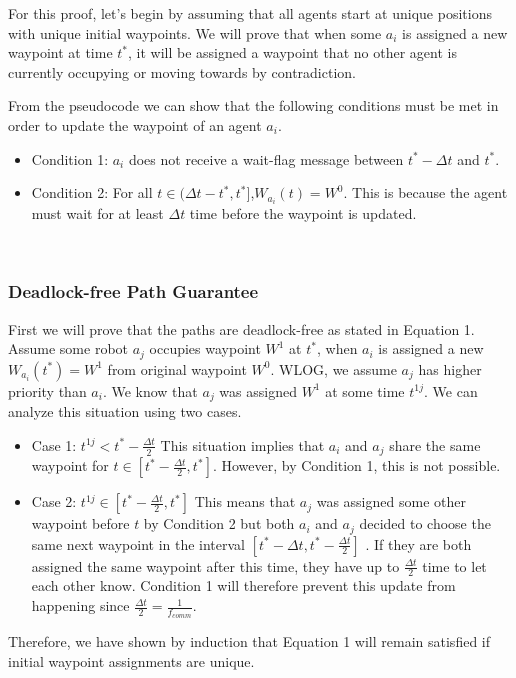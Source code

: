 For this proof, let's begin by assuming that all agents start at unique positions with unique initial waypoints. We will prove that when some $a_i$ is assigned a new waypoint at time $t^*$, it will be assigned a waypoint that no other agent is currently occupying or moving towards by contradiction. 

From the pseudocode we can show that the following conditions must be met in order to update the waypoint of an agent $a_i$.

\begin{itemize}
    \item Condition 1: $a_i$ does not receive a wait-flag message between $t^* - \Delta t$ and $t^*$.
    \item Condition 2: For all $t \in (\Delta t - t^*, t^*]$,$ W_{a_i}(t) = W^0$. This is because the agent must wait for at least $\Delta t$ time before the waypoint is updated. 
\end{itemize}
\\

\subsubsection{Deadlock-free Path Guarantee}
First we will prove that the paths are deadlock-free as stated in Equation 1. Assume some robot $a_j$ occupies waypoint $W^{1}$ at $t^*$, when $a_i$ is assigned a new $W_{a_i}(t^*) = W^1$ from original waypoint $W^0$. WLOG, we assume $a_j$ has higher priority than $a_i$. We know that $a_j$ was assigned $W^1$ at some time $t^{1j}$. We can analyze this situation using two cases. 
\begin{itemize}
    \item Case 1: $t^{1j} < t^* - \frac{\Delta t}{2}$ 
This situation implies that $a_i$ and $a_j$ share the same waypoint for $t \in [t^* - \frac{\Delta t}{2}, t^*]$. However, by Condition 1, this is not possible. 
\item 
Case 2:  $t^{1j} \in [t^* - \frac{\Delta t}{2}, t^*]$
This means that $a_j$ was assigned some other waypoint before $t$ by Condition 2 but both $a_i$ and $a_j$ decided to choose the same next waypoint in the interval $[t^* - {\Delta t}, t^* - \frac{\Delta t}{2}]$ . If they are both assigned the same waypoint after this time, they have up to $\frac{\Delta t}{2}$ time to let each other know. Condition 1 will therefore prevent this update from happening since $\frac{\Delta t}{2} = \frac{1}{f_{comm}}$. 
\end{itemize}
Therefore, we have shown by induction that Equation 1 will remain satisfied if initial waypoint assignments are unique. 


